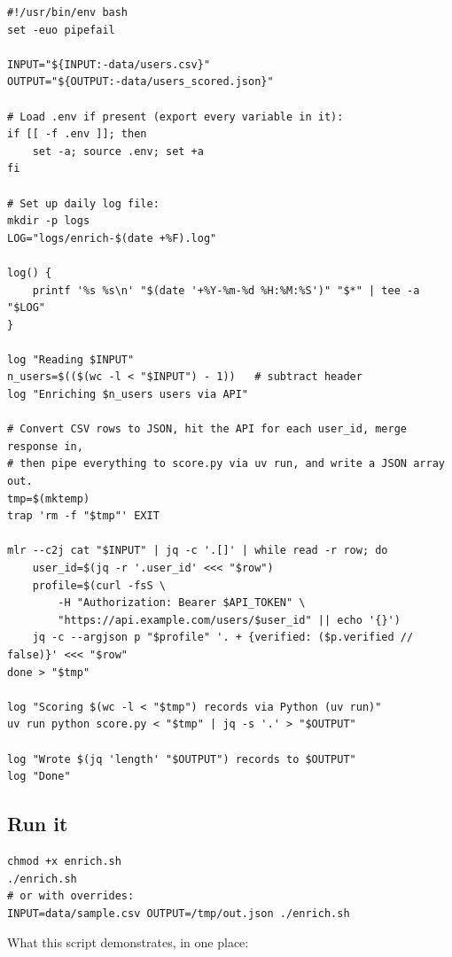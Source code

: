 \documentclass[11pt,a4paper]{article}
\begin{document}
\begin{lstlisting}[style=bashstyle]
#!/usr/bin/env bash
set -euo pipefail

INPUT="${INPUT:-data/users.csv}"
OUTPUT="${OUTPUT:-data/users_scored.json}"

# Load .env if present (export every variable in it):
if [[ -f .env ]]; then
    set -a; source .env; set +a
fi

# Set up daily log file:
mkdir -p logs
LOG="logs/enrich-$(date +%F).log"

log() {
    printf '%s %s\n' "$(date '+%Y-%m-%d %H:%M:%S')" "$*" | tee -a "$LOG"
}

log "Reading $INPUT"
n_users=$(($(wc -l < "$INPUT") - 1))   # subtract header
log "Enriching $n_users users via API"

# Convert CSV rows to JSON, hit the API for each user_id, merge response in,
# then pipe everything to score.py via uv run, and write a JSON array out.
tmp=$(mktemp)
trap 'rm -f "$tmp"' EXIT

mlr --c2j cat "$INPUT" | jq -c '.[]' | while read -r row; do
    user_id=$(jq -r '.user_id' <<< "$row")
    profile=$(curl -fsS \
        -H "Authorization: Bearer $API_TOKEN" \
        "https://api.example.com/users/$user_id" || echo '{}')
    jq -c --argjson p "$profile" '. + {verified: ($p.verified // false)}' <<< "$row"
done > "$tmp"

log "Scoring $(wc -l < "$tmp") records via Python (uv run)"
uv run python score.py < "$tmp" | jq -s '.' > "$OUTPUT"

log "Wrote $(jq 'length' "$OUTPUT") records to $OUTPUT"
log "Done"
\end{lstlisting}

\subsection*{Run it}

\begin{lstlisting}[style=bashstyle]
chmod +x enrich.sh
./enrich.sh
# or with overrides:
INPUT=data/sample.csv OUTPUT=/tmp/out.json ./enrich.sh
\end{lstlisting}

What this script demonstrates, in one place:
\end{document}
